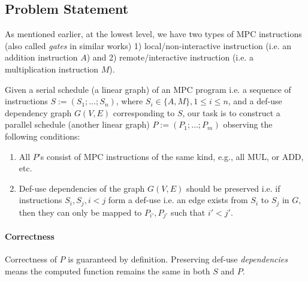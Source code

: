 \subsection{Problem Statement}
\label{sec:problem}


As mentioned earlier, at the lowest level, we have two types of MPC instructions (also called \emph{gates} in similar works) 1) local/non-interactive instruction (i.e. an addition instruction $A$) and 2) remote/interactive instruction (i.e. a multiplication instruction $M$). %


Given a serial schedule (a linear graph) of an MPC program i.e. a sequence of instructions $S := (S_1; \dots; S_n)$, where $S_i \in \{A, M\}, 1 \leq i \leq n$, and a def-use dependency graph $G(V, E)$ corresponding to $S$, our task is to construct a parallel schedule (another linear graph) $P := (P_1; \dots; P_m)$ observing the following conditions:

\begin{enumerate}
    \item All $P$'s consist of MPC instructions of the same kind, e.g., all MUL, or ADD, etc. 
    \item Def-use dependencies of the graph $G(V, E)$ should be preserved i.e. if instructions $S_i, S_j, i < j$ form a def-use i.e. an edge exists from $S_i$ to $S_j$ in $G$, then they can only be mapped to $P_{i'}, P_{j'}$ such that $i' < j'$.
\end{enumerate}

\paragraph{Correctness} Correctness of $P$ is guaranteed by definition. Preserving def-use \emph{dependencies} means the computed function remains the same in both $S$ and $P$.

